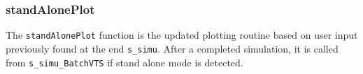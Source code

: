 \subsubsection{standAlonePlot}  
The \verb|standAlonePlot| function is the updated plotting routine based on user input previously found at the end \verb|s_simu|.
After a completed simulation, it is called from \verb|s_simu_BatchVTS| if stand alone mode is detected.

